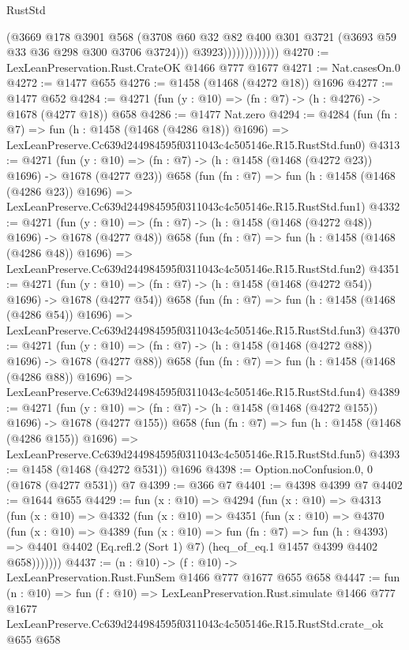 \begin{lexlean}{RustStd}
\begin{coremodule}
                              (@3669
                                @178
                                @3901
                                @568
                                (@3708
                                  @60
                                  @32
                                  @82
                                  @400
                                  @301
                                  @3721
                                  (@3693 @59 @33 @36 @298 @300 @3706 @3724)))
                              @3923)))))))))))))
@4270 := LexLeanPreservation.Rust.CrateOK @1466 @777 @1677
@4271 := Nat.casesOn.{0}
@4272 := @1477 @655
@4276 := @1458 (@1468 (@4272 @18)) @1696
@4277 := @1477 @652
@4284 := @4271 (fun (y : @10) => (fn : @7) -> (h : @4276) -> @1678 (@4277 @18)) @658
@4286 := @1477 Nat.zero
@4294 := @4284
    (fun (fn : @7) =>
    fun (h : @1458 (@1468 (@4286 @18)) @1696) =>
    LexLeanPreserve.Cc639d244984595f0311043c4c505146e.R15.RustStd.fun0)
@4313 := @4271
    (fun (y : @10) => (fn : @7) -> (h : @1458 (@1468 (@4272 @23)) @1696) -> @1678 (@4277 @23))
    @658
    (fun (fn : @7) =>
    fun (h : @1458 (@1468 (@4286 @23)) @1696) =>
    LexLeanPreserve.Cc639d244984595f0311043c4c505146e.R15.RustStd.fun1)
@4332 := @4271
    (fun (y : @10) => (fn : @7) -> (h : @1458 (@1468 (@4272 @48)) @1696) -> @1678 (@4277 @48))
    @658
    (fun (fn : @7) =>
    fun (h : @1458 (@1468 (@4286 @48)) @1696) =>
    LexLeanPreserve.Cc639d244984595f0311043c4c505146e.R15.RustStd.fun2)
@4351 := @4271
    (fun (y : @10) => (fn : @7) -> (h : @1458 (@1468 (@4272 @54)) @1696) -> @1678 (@4277 @54))
    @658
    (fun (fn : @7) =>
    fun (h : @1458 (@1468 (@4286 @54)) @1696) =>
    LexLeanPreserve.Cc639d244984595f0311043c4c505146e.R15.RustStd.fun3)
@4370 := @4271
    (fun (y : @10) => (fn : @7) -> (h : @1458 (@1468 (@4272 @88)) @1696) -> @1678 (@4277 @88))
    @658
    (fun (fn : @7) =>
    fun (h : @1458 (@1468 (@4286 @88)) @1696) =>
    LexLeanPreserve.Cc639d244984595f0311043c4c505146e.R15.RustStd.fun4)
@4389 := @4271
    (fun (y : @10) => (fn : @7) -> (h : @1458 (@1468 (@4272 @155)) @1696) -> @1678 (@4277 @155))
    @658
    (fun (fn : @7) =>
    fun (h : @1458 (@1468 (@4286 @155)) @1696) =>
    LexLeanPreserve.Cc639d244984595f0311043c4c505146e.R15.RustStd.fun5)
@4393 := @1458 (@1468 (@4272 @531)) @1696
@4398 := Option.noConfusion.{0, 0} (@1678 (@4277 @531)) @7
@4399 := @366 @7
@4401 := @4398 @4399 @7
@4402 := @1644 @655
@4429 := fun (x : @10) =>
  @4294
    (fun (x : @10) =>
    @4313
      (fun (x : @10) =>
      @4332
        (fun (x : @10) =>
        @4351
          (fun (x : @10) =>
          @4370
            (fun (x : @10) =>
            @4389
              (fun (x : @10) =>
              fun (fn : @7) =>
              fun (h : @4393) =>
              @4401 @4402 (Eq.refl.{2} (Sort 1) @7) (heq_of_eq.{1} @1457 @4399 @4402 @658)))))))
@4437 := (n : @10) -> (f : @10) -> LexLeanPreservation.Rust.FunSem @1466 @777 @1677 @655 @658
@4447 := fun (n : @10) =>
  fun (f : @10) =>
  LexLeanPreservation.Rust.simulate
    @1466
    @777
    @1677
    LexLeanPreserve.Cc639d244984595f0311043c4c505146e.R15.RustStd.crate_ok
    @655
    @658
\end{coremodule}
\end{lexlean}
